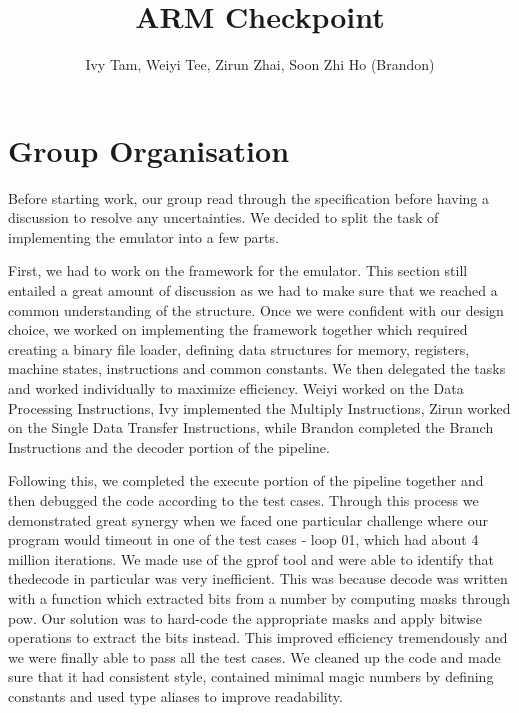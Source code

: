 \documentclass[11pt]{article}
\begin{document}
\title{ARM Checkpoint}
\author{Ivy Tam, Weiyi Tee, Zirun Zhai, Soon Zhi Ho (Brandon)}

\maketitle

\section{Group Organisation}

Before starting work, our group read through the specification before having a discussion to resolve any uncertainties. We decided to split the task of implementing the emulator into a few parts. \par 
First, we had to work on the framework for the emulator. This section still entailed a great amount of discussion as we had to make sure that we reached a common understanding of the structure. Once we were confident with our design choice, we worked on implementing the framework together which required creating a binary file loader, defining data structures for memory, registers, machine states, instructions and common constants. We then delegated the tasks and worked individually to maximize efficiency. Weiyi worked on the Data Processing Instructions, Ivy implemented the Multiply Instructions, Zirun worked on the Single Data Transfer Instructions, while Brandon completed the Branch Instructions and the decoder portion of the pipeline. \par 
Following this, we completed the execute portion of the pipeline together and then debugged the code according to the test cases. Through this process we demonstrated great synergy when we faced one particular challenge where our program would timeout in one of the test cases - loop 01, which had about 4 million iterations. We made use of the gprof tool and were able to identify that thedecode in particular was very inefficient. This was because decode was written with a function which extracted bits from a number by computing masks through pow. Our solution was to hard-code the appropriate masks and apply bitwise operations to extract the bits instead. This improved efficiency tremendously and we were finally able to pass all the test cases. We cleaned up the code and made sure that it had consistent style, contained minimal magic numbers by defining constants and used type aliases to improve readability. \par 
\end{document}
